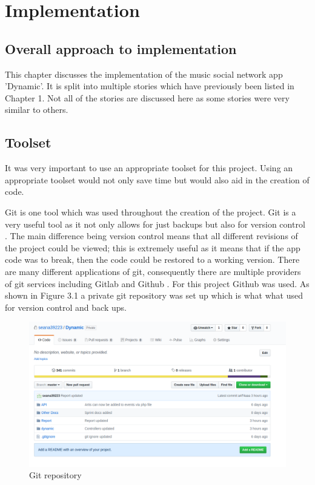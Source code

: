 \chapter{Implementation}
\section{Overall approach to implementation}
This chapter discusses the implementation of the music social network app 'Dynamic'. It is split into  multiple stories which have previously been listed in Chapter 1. Not all of the stories are discussed here as some stories were very similar to others.

\section{Toolset}
It was very important to use an appropriate toolset for this project. Using an appropriate toolset would not only save time but would also aid in the creation of code.

Git is one tool which was used throughout the creation of the project. Git is a very useful tool as it not only allows for just backups but also for version control \cite{git}. The main difference being version control means that all different revisions of the project could be viewed; this is extremely useful as it means that if the app code was to break, then the code could be restored to a working version. There are many different applications of git, consequently there are multiple providers of git services including Gitlab and Github \cite{github} \cite{gitlab}. For this project Github was used. As shown in Figure 3.1 a private git repository was set up which is what what used for version control and back ups.
\begin{center} 
\begin{figure}[H]
\begin{center}
\includegraphics[scale=0.3]{images/git}
\end{center}
\caption{Git repository}
\end{figure}
\end{center}

